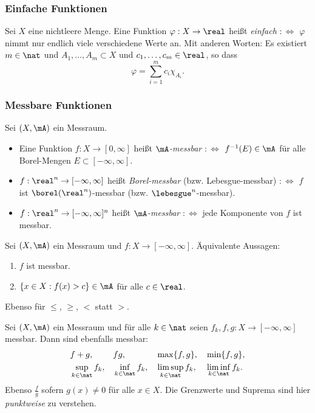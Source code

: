 \subsubsection{Einfache Funktionen}
Sei $X$ eine nichtleere Menge. Eine Funktion $\varphi: X \to \real$ heißt \emph{einfach} $:\Leftrightarrow$ $\varphi$ nimmt nur endlich viele verschiedene Werte an. Mit anderen Worten: Es existiert $m \in \nat$ und $A_1, \ldots, A_m \subset X$ und $c_1, \ldots, c_m \in \real$, so dass
\[ \varphi = \sum_{i=1}^m c_i \chi_{A_i}. \]

\subsubsection{Messbare Funktionen}
Sei $(X, \mA)$ ein Messraum.
\begin{itemize}
 \item Eine Funktion $f: X \to [0, \infty]$ heißt \emph{$\mA$-messbar} $:\Leftrightarrow$ $f^{-1}(E) \in \mA$ für alle Borel-Mengen $E \subset [-\infty,\infty]$.
 \item $f: \real^n \to [-\infty,\infty]$ heißt \emph{Borel-messbar} (bzw. Lebesgue-messbar) $:\Leftrightarrow$ $f$ ist $\borel(\real^n)$-messbar (bzw. $\lebesgue^n$-messbar).
 \item $f: \real^n \to [-\infty,\infty]^n$ heißt \emph{$\mA$-messbar} $:\Leftrightarrow$ jede Komponente von $f$ ist messbar.
\end{itemize}

\begin{rmrk}
 Sei $(X, \mA)$ ein Messraum und $f: X \to [-\infty,\infty]$. Äquivalente Aussagen:
 \begin{enumerate}
  \item $f$ ist messbar.
  \item $\{ x \in X: f(x) > c \} \in \mA$ für alle $c \in \real$.
 \end{enumerate}
 Ebenso für $\le$, $\ge$, $<$ statt $>$.
\end{rmrk}

\begin{thm}
 Sei $(X, \mA)$ ein Messraum und für alle $k \in \nat$ seien $f_k, f, g: X \to [-\infty,\infty]$ messbar. Dann sind ebenfalls messbar:
 \begin{align*}
 &f+g,& &fg,& &\max\{ f, g \},& &\min\{ f, g \}, \\ 
 &\sup_{k \in \nat} f_k, & &\inf_{k \in \nat} f_k,& &\limsup_{k \in \nat} f_k,& &\liminf_{k \in \nat} f_k.
 \end{align*}
 Ebenso $\frac{f}{g}$ sofern $g(x) \ne 0$ für alle $x \in X$. Die Grenzwerte und Suprema sind hier \emph{punktweise} zu verstehen.
\end{thm}

